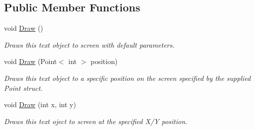 \subsection*{Public Member Functions}
\begin{DoxyCompactItemize}
\item 
void \hyperlink{interface_tri_devs_1_1_tri_engine2_d_1_1_text_1_1_i_text_object_a5a3793a417de1b06940dac3f16ad193a}{Draw} ()
\begin{DoxyCompactList}\small\item\em Draws this text object to screen with default parameters. \end{DoxyCompactList}\item 
void \hyperlink{interface_tri_devs_1_1_tri_engine2_d_1_1_text_1_1_i_text_object_afa5b95215db804ea89f6bd5a1ea6658d}{Draw} (Point$<$ int $>$ position)
\begin{DoxyCompactList}\small\item\em Draws this text object to a specific position on the screen specified by the supplied Point struct. \end{DoxyCompactList}\item 
void \hyperlink{interface_tri_devs_1_1_tri_engine2_d_1_1_text_1_1_i_text_object_a8f0606e90a8944c9ab8a49f2aac09876}{Draw} (int x, int y)
\begin{DoxyCompactList}\small\item\em Draws this text oject to screen at the specified X/\-Y position. \end{DoxyCompactList}\end{DoxyCompactItemize}
